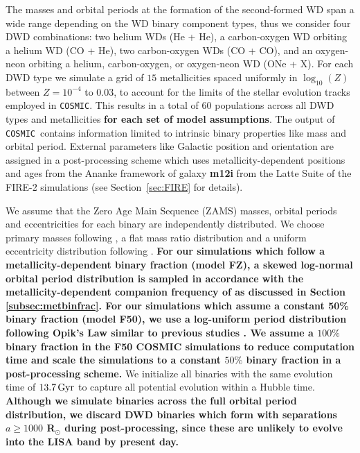 \documentclass[twocolumn, linenumbers]{aastex631}
\newcommand{\cosmic}{\texttt{COSMIC}}
\begin{document}
The masses and orbital periods at the formation of the second-formed WD span a wide range depending on the WD binary component types, thus we consider four DWD combinations: two helium WDs (He + He), a carbon-oxygen WD orbiting a helium WD (CO + He), two carbon-oxygen WDs (CO + CO), and an oxygen-neon orbiting a helium, carbon-oxygen, or oxygen-neon WD (ONe + X). For each DWD type we simulate a grid of $15$ metallicities spaced uniformly in $\log_{10}(Z)$ between $Z=10^{-4}$ to $0.03$, to account for the limits of the \citet{Hurley2000} stellar evolution tracks employed in \cosmic. This results in a total of $60$ populations across all DWD types and metallicities \textbf{for each set of model assumptions}. The output of \cosmic\ contains information limited to intrinsic binary properties like mass and orbital period. External parameters like Galactic position and orientation are assigned in a post-processing scheme which uses metallicity-dependent positions and ages from the Ananke framework of galaxy \textbf{m12i} from the Latte Suite of the FIRE-2 simulations (see Section~\ref{sec:FIRE} for details).


We assume that the Zero Age Main Sequence (ZAMS) masses, orbital periods and eccentricities for each binary are independently distributed. We choose primary masses following \citet{Kroupa2001}, a flat mass ratio distribution \citep{Mazeh1992, Goldberg1994} and a uniform eccentricity distribution following \cite{Geller2019}. \textbf{For our simulations which follow a metallicity-dependent binary fraction (model FZ), a skewed log-normal orbital period distribution is sampled in accordance with the metallicity-dependent companion frequency of \citet{Moe2021} as discussed in Section \ref{subsec:metbinfrac}. For our simulations which assume a constant 50\% binary fraction (model F50), we use a log-uniform period distribution following Opik's Law similar to previous studies \citep[e.g.][]{Nelemans2001a, Toonen2012, Korol2017, Lamberts2019}. We assume a $100\%$ binary fraction in the F50 COSMIC simulations to reduce computation time and scale the simulations to a constant $50\%$ binary fraction in a post-processing scheme.} We initialize all binaries with the same evolution time of $13.7\,\rm{Gyr}$ to capture all potential evolution within a Hubble time. \textbf{Although we simulate binaries across the full orbital period distribution, we discard DWD binaries which form with separations $a\geq 1000$ R$_\odot$ during post-processing, since these are unlikely to evolve into the LISA band by present day.} 
\end{document}
